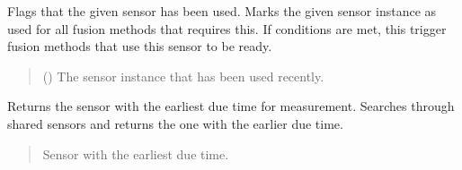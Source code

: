 \documentclass[letterpaper,10pt,english]{sphinxmanual}
\begin{document}
\begin{fulllineitems}
\begin{fulllineitems}
\end{fulllineitems}


\begin{fulllineitems}
\label{\detokenize{modules/simulation/scheduling:qnav.simulation.scheduling.TimingHandler.set_sensor_used}}
\pysigstartsignatures
{}
\pysigstopsignatures
\sphinxAtStartPar
Flags that the given sensor has been used.
Marks the given sensor instance as used for all fusion methods that
requires this. If conditions are met, this trigger fusion methods
that use this sensor to be ready.
\begin{quote}\begin{description}
\sphinxAtStartPar
{} ({\hyperref[\detokenize{modules/measurement/sensor:qnav.measurement.sensor.Sensor}]{}}) \textendash{} The sensor instance that has been used recently.

\end{description}\end{quote}

\end{fulllineitems}


\begin{fulllineitems}
\label{\detokenize{modules/simulation/scheduling:qnav.simulation.scheduling.TimingHandler.get_next_sensor}}
\pysigstartsignatures
{}
\pysigstopsignatures
\sphinxAtStartPar
Returns the sensor with the earliest due time for measurement.
Searches through shared sensors and returns the one with the
earlier due time.
\begin{quote}\begin{description}
\sphinxAtStartPar
Sensor with the earliest due time.


\end{description}
\end{quote}
\end{fulllineitems}
\end{fulllineitems}
\end{document}
